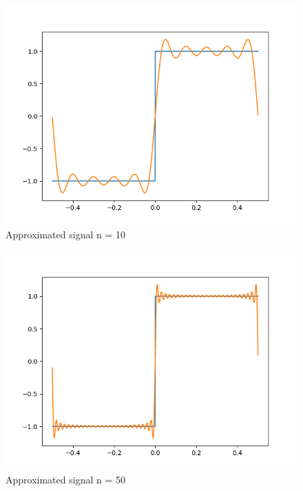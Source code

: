 \documentclass[10pt,a4paper, margin=1in]{article}
\begin{document}
\begin{enumerate}
\begin{enumerate}
\begin{figure}[H]
            \includegraphics[scale=0.75]{approximated_n=10.png}
            \caption{Approximated signal n = 10}
        \end{figure}
        \begin{figure}[H]
            \includegraphics[scale=0.75]{approximated_n=50.png}
            \caption{Approximated signal n = 50}
        \end{figure}
        \begin{figure}[H]

\end{figure}
\end{enumerate}
\end{enumerate}
\end{document}
